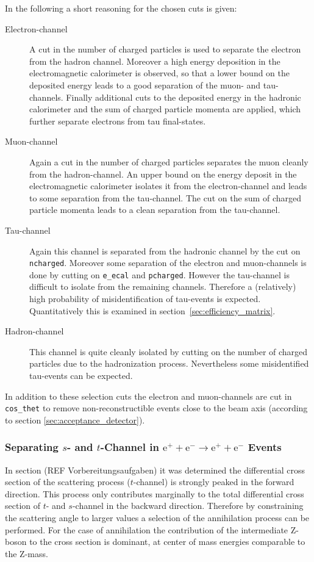 \documentclass[11pt, a4paper]{article}
\numberwithin{equation}{section}
\newcommand{\korr}[1]{{\color{red}(#1)}}
\begin{document}
\noindent In the following a short reasoning for the chosen cuts is given:
\begin{description}
	\item[Electron-channel] A cut in the number of charged particles is used to separate the electron from the hadron channel.
	Moreover a high energy deposition in the electromagnetic calorimeter is observed, so that a lower bound on the deposited energy leads to a good separation of the muon- and tau-channels.
	Finally additional cuts to the deposited energy in the hadronic calorimeter and the sum of charged particle momenta are applied, which further separate electrons from tau final-states.
	
	\item[Muon-channel] Again a cut in the number of charged particles separates the muon cleanly from the hadron-channel.
	An upper bound on the energy deposit in the electromagnetic calorimeter isolates it from the electron-channel and leads to some separation from the tau-channel.
	The cut on the sum of charged particle momenta leads to a clean separation from the tau-channel.	
	
	\item[Tau-channel] Again this channel is separated from the hadronic channel by the cut on \texttt{ncharged}.
	Moreover some separation of the electron and muon-channels is done by cutting on \texttt{e\_ecal} and \texttt{pcharged}.
	However the tau-channel is difficult to isolate from the remaining channels.
	Therefore a (relatively) high probability of misidentification of tau-events is expected.
	Quantitatively this is examined in section~\ref{sec:efficiency_matrix}. 
	
	\item[Hadron-channel] This channel is quite cleanly isolated by cutting on the number of charged particles due to the hadronization process.
	Nevertheless some misidentified tau-events can be expected.
\end{description}
In addition to these selection cuts the electron and muon-channels are cut in \texttt{cos\_thet} to remove non-reconstructible events close to the beam axis (according to section \ref{sec:acceptance_detector}).

\subsubsection{Separating $s$- and $t$-Channel in $\mathrm{e}^+ + \mathrm{e}^- \rightarrow \mathrm{e}^+ + \mathrm{e}^-$ Events}
\label{sec:s_t_channel_separation}
In section \korr{REF Vorbereitungsaufgaben} it was determined the differential cross section of the scattering process ($t$-channel) is strongly peaked in the forward direction.
This process only contributes marginally to the total differential cross section of $t$- and $s$-channel in the backward direction.
Therefore by constraining the scattering angle to larger values a selection of the annihilation process can be performed.
For the case of annihilation the contribution of the intermediate Z-boson to the cross section is dominant, at center of mass energies comparable to the Z-mass.
\end{document}
